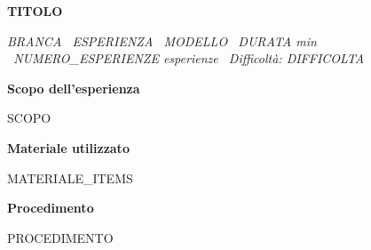 \documentclass[11pt,a4paper]{article}
\begin{document}
{\LARGE\bfseries {{TITOLO}}\par}
\vspace{2pt}
{\small\itshape
  {{BRANCA}} \textperiodcentered\ {{ESPERIENZA}} \textperiodcentered\ {{MODELLO}}
  \textperiodcentered\ {{DURATA}} min
  \textperiodcentered\ {{NUMERO_ESPERIENZE}} esperienze
  \textperiodcentered\ Difficoltà: {{DIFFICOLTA}}\par
}

\vspace{14pt}
{\bfseries Scopo dell'esperienza}\par
{{SCOPO}}

\vspace{10pt}
{\bfseries Materiale utilizzato}
\begin{itemize}
{{MATERIALE_ITEMS}}
\end{itemize}

\vspace{10pt}
{\bfseries Procedimento}\par
{{PROCEDIMENTO}}
\end{document}

